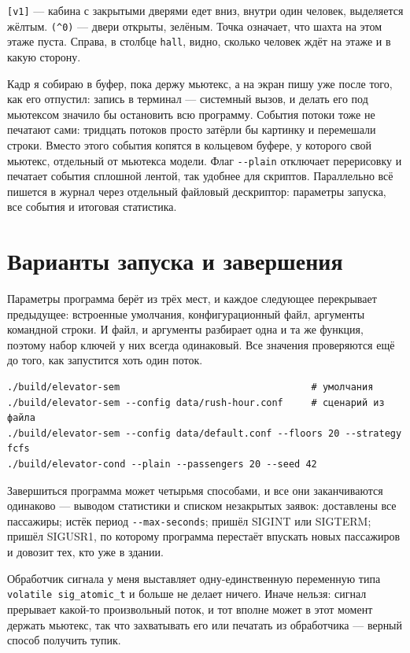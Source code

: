 \documentclass[12pt,a4paper]{article}
\begin{document}
\verb|[v1]| --- кабина с закрытыми дверями едет вниз, внутри один
человек, выделяется жёлтым. \verb|(^0)| --- двери открыты, зелёным.
Точка означает, что шахта на этом этаже пуста. Справа, в столбце
\verb|hall|, видно, сколько человек ждёт на этаже и в какую сторону.

Кадр я собираю в буфер, пока держу мьютекс, а на экран пишу уже после
того, как его отпустил: запись в терминал --- системный вызов, и делать
его под мьютексом значило бы остановить всю программу. События потоки
тоже не печатают сами: тридцать потоков просто затёрли бы картинку и
перемешали строки. Вместо этого события копятся в кольцевом буфере, у
которого свой мьютекс, отдельный от мьютекса модели. Флаг
\verb|--plain| отключает перерисовку и печатает события сплошной лентой,
так удобнее для скриптов. Параллельно всё пишется в журнал через
отдельный файловый дескриптор: параметры запуска, все события и итоговая
статистика.

\section{Варианты запуска и завершения}

Параметры программа берёт из трёх мест, и каждое следующее перекрывает
предыдущее: встроенные умолчания, конфигурационный файл, аргументы
командной строки. И файл, и аргументы разбирает одна и та же функция,
поэтому набор ключей у них всегда одинаковый. Все значения проверяются
ещё до того, как запустится хоть один поток.

{\small
\begin{verbatim}
./build/elevator-sem                                  # умолчания
./build/elevator-sem --config data/rush-hour.conf     # сценарий из файла
./build/elevator-sem --config data/default.conf --floors 20 --strategy fcfs
./build/elevator-cond --plain --passengers 20 --seed 42
\end{verbatim}
}

Завершиться программа может четырьмя способами, и все они заканчиваются
одинаково --- выводом статистики и списком незакрытых заявок: доставлены
все пассажиры; истёк период \verb|--max-seconds|; пришёл SIGINT или
SIGTERM; пришёл SIGUSR1, по которому программа перестаёт впускать новых
пассажиров и довозит тех, кто уже в здании.

Обработчик сигнала у меня выставляет одну-единственную переменную типа
\verb|volatile sig_atomic_t| и больше не делает ничего. Иначе нельзя:
сигнал прерывает какой-то произвольный поток, и тот вполне может в этот
момент держать мьютекс, так что захватывать его или печатать из
обработчика --- верный способ получить тупик.
\end{document}
